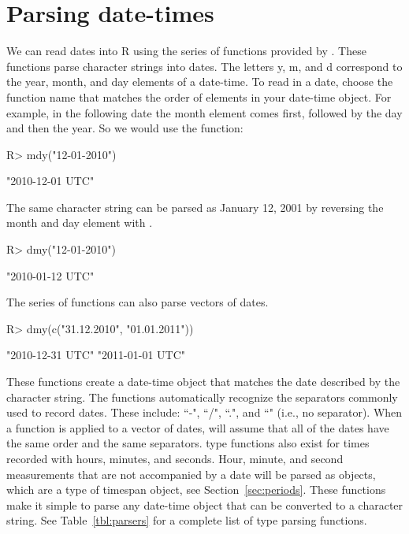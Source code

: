 \documentclass[article]{jss}
\begin{document}





\section{Parsing date-times}
\label{sec:parsing}

We can read dates into R using the  series of functions provided by . These functions parse character strings into dates. The letters y, m, and d correspond to the year, month, and day elements of a date-time. To read in a date, choose the function name that matches the order of elements in your date-time object. For example, in the following date the month element comes first, followed by the day and then the year. So we would use the  function:

\begin{CodeInput}
R> mdy("12-01-2010")
\end{CodeInput}
\begin{CodeOutput}
[1] "2010-12-01 UTC"
\end{CodeOutput}

The same character string can be parsed as January 12, 2001 by reversing the month and day element with .

\begin{CodeInput}
R> dmy("12-01-2010")
\end{CodeInput}
\begin{CodeOutput}
[1] "2010-01-12 UTC"
\end{CodeOutput}

The  series of functions can also parse vectors of dates.

\begin{CodeInput}
R> dmy(c("31.12.2010", "01.01.2011"))
\end{CodeInput}
\begin{CodeOutput}
[1] "2010-12-31 UTC" "2011-01-01 UTC"
\end{CodeOutput}


These functions create a  date-time object that matches the date described by the character string.  The functions automatically recognize the separators commonly used to record dates. These include: ``-", ``/", ``.", and ``" (i.e., no separator).  When a  function is applied to a vector of dates,  will assume that all of the dates have the same order and the same separators.  type functions also exist for times recorded with hours, minutes, and seconds. Hour, minute, and second measurements that are not accompanied by a date will be parsed as  objects, which are a type of timespan object, see Section~\ref{sec:periods}. These functions make it simple to parse any date-time object that can be converted to a character string. See Table~\ref{tbl:parsers} for a complete list of  type parsing functions.
\end{document}
